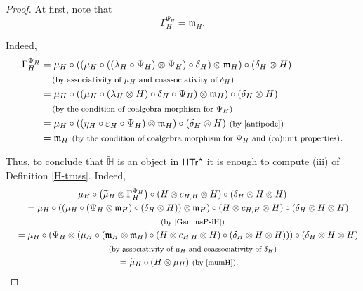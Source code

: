 \documentclass[pdftex]{sigma}
\numberwithin{equation}{section}
\begin{document}
\begin{proof}
At first, note that
\begin{equation}\label{GammaPsiH}
\Gamma_{H}^{\Psi_{H}}=\mathfrak{m}_{H}.
\end{equation}

Indeed,
\begin{align*}
\Gamma_{H}^{\Psi_{H}}
&{}=\mu_{H}\circ((\mu_{H}\circ((\lambda_{H}\circ\Psi_{H})\otimes\Psi_{H})\circ\delta_{H})\otimes\mathfrak{m}_{H})\circ(\delta_{H}\otimes H)\\
&\quad{}\, \text{\footnotesize\textnormal{(by associativity of $\mu_{H}$ and coassociativity of $\delta_{H}$)}}\\
&{}=\mu_{H}\circ((\mu_{H}\circ(\lambda_{H}\otimes H)\circ\delta_{H}\circ\Psi_{H})\otimes\mathfrak{m}_{H})\circ(\delta_{H}\otimes H)\\
&\quad{}\, \text{\footnotesize\textnormal{(by the condition of coalgebra morphism for $\Psi_{H}$)}}\\
&{}=\mu_{H}\circ((\eta_{H}\circ\varepsilon_{H}\circ\Psi_{H})\otimes\mathfrak{m}_{H})\circ(\delta_{H}\otimes H)\ \text{\footnotesize\textnormal{(by \eqref{antipode})}}\\
&{}=\mathfrak{m}_{H}\ \text{\footnotesize\textnormal{(by the condition of coalgebra morphism for $\Psi_{H}$ and (co)unit properties)}}.
\end{align*}

Thus, to conclude that $\widetilde{\mathbb{H}}$ is an object in $\sf{HTr}^{\star}$ it is enough to compute (iii) of Definition \ref{H-truss}. Indeed,
\begin{gather*}
\mu_{H}\circ\bigl(\widetilde{\mu}_{H}\otimes\Gamma_{H}^{\Psi_{H}}\bigr)\circ(H\otimes c_{H,H}\otimes H)\circ(\delta_{H}\otimes H\otimes H)\\
\quad{}=\mu_{H}\circ((\mu_{H}\circ(\Psi_{H}\otimes\mathfrak{m}_{H})\circ(\delta_{H}\otimes H))\otimes \mathfrak{m}_{H})\circ(H\otimes c_{H,H}\otimes H)\circ(\delta_{H}\otimes H\otimes H)\\
\qquad{}\;\text{\footnotesize\textnormal{(by \eqref{GammaPsiH})}}\\
\quad{}=\mu_{H}\circ(\Psi_{H}\otimes(\mu_{H}\circ(\mathfrak{m}_{H}\otimes\mathfrak{m}_{H})\circ(H\otimes c_{H,H}\otimes H)\circ(\delta_{H}\otimes H\otimes H)))\circ(\delta_{H}\otimes H\otimes H)\\
\qquad{}\; \text{\footnotesize\textnormal{(by associativity of $\mu_{H}$ and coassociativity of $\delta_{H}$)}}\\
\quad{}=\widetilde{\mu}_{H}\circ(H\otimes\mu_{H})\ \text{\footnotesize\textnormal{(by \eqref{mumH})}}.\tag*{\qed}
\end{gather*}
\renewcommand{\qed}{}
\end{proof}
\end{document}
